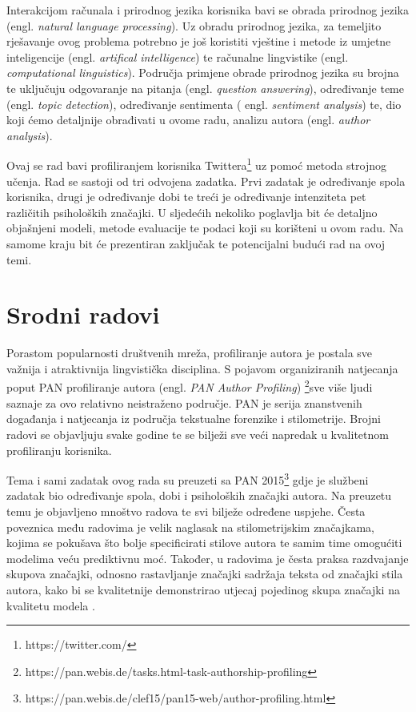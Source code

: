 \documentclass[times, utf8, zavrsni]{fer}
\begin{document}
Interakcijom računala i prirodnog jezika korisnika bavi se obrada prirodnog jezika (engl. \textit{natural language processing}). Uz obradu prirodnog jezika, za temeljito rješavanje ovog problema potrebno je još koristiti vještine i metode iz umjetne inteligencije (engl. \textit{artifical intelligence}) te računalne lingvistike (engl. \textit{computational linguistics}). Područja primjene obrade prirodnog jezika su brojna te uključuju odgovaranje na pitanja (engl. \textit{question answering}), određivanje teme (engl. \textit{topic detection}), određivanje sentimenta ( engl. \textit{sentiment analysis}) te, dio koji ćemo detaljnije obrađivati u ovome radu, analizu autora (engl. \textit{author analysis}).

Ovaj se rad bavi profiliranjem korisnika Twittera\footnote{https://twitter.com/} uz pomoć metoda strojnog učenja. Rad se sastoji od tri odvojena zadatka. Prvi zadatak je određivanje spola korisnika, drugi je određivanje dobi te treći je određivanje intenziteta pet različitih psiholoških značajki. U sljedećih nekoliko poglavlja bit će detaljno objašnjeni modeli, metode evaluacije te podaci koji su korišteni u ovom radu. Na samome kraju bit će prezentiran zaključak te potencijalni budući rad na ovoj temi. 


\chapter{Srodni radovi}


Porastom popularnosti društvenih mreža, profiliranje autora je postala sve važnija i atraktivnija lingvistička disciplina. S pojavom organiziranih natjecanja poput PAN profiliranje autora (engl. \textit{PAN Author Profiling}) \footnote{https://pan.webis.de/tasks.html-task-authorship-profiling}sve više ljudi saznaje za ovo relativno neistraženo područje. PAN je serija znanstvenih događanja i natjecanja iz područja tekstualne forenzike i stilometrije. Brojni radovi se objavljuju svake godine te se bilježi sve veći napredak u kvalitetnom profiliranju korisnika. 

Tema i sami zadatak ovog rada su preuzeti sa PAN 2015\footnote{https://pan.webis.de/clef15/pan15-web/author-profiling.html} gdje je službeni zadatak bio određivanje spola, dobi i psiholoških značajki autora. Na preuzetu temu je objavljeno mnoštvo radova te svi bilježe određene uspjehe. Česta poveznica među radovima je velik naglasak na stilometrijskim značajkama, kojima se pokušava što bolje specificirati stilove autora te samim time omogućiti modelima veću prediktivnu moć. Također, u radovima je česta praksa razdvajanje skupova značajki, odnosno rastavljanje značajki sadržaja teksta od značajki stila autora, kako bi se kvalitetnije demonstrirao utjecaj pojedinog skupa značajki na kvalitetu modela \citep{rangel2013}. 
\end{document}
